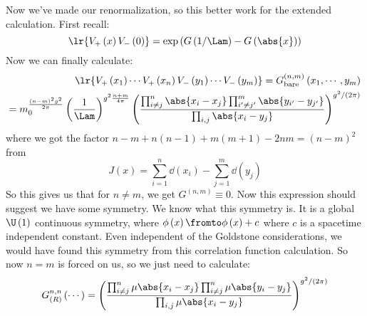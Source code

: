 \documentclass{booc}
\begin{document}
Now we've made our renormalization, so this better work for 
the extended calculation.
First recall:
\begin{equation}
\lr{V_+\left( x \right) V_-\left( 0 \right)} = 
\exp\left( 
G\left( 1/ \Lam \right) - G\left( \abs{x} \right)
\right)
\end{equation}
Now we can finally calculate:
\begin{eqnarray}
\lr{V_+\left( x_1 \right)\cdots V_+\left( x_n \right)
V_-\left( y_1 \right) \cdots V_-\left( y_m \right)}
=
G_{\text{bare}}^{\left( n,m \right)}\left( x_1, \cdots , y_m \right) \\
=
m_0^{\frac{\left( n-m \right)^2g^2 }{ 2\pi}}
\left( 
\frac{1}{\Lam}
\right)^{g^2\frac{n+m }{4\pi}}
\left( 
\frac{
\prod_{i\neq j}^n \abs{x_i - x_j}
\prod_{i'\neq j'}^m \abs{y_{i'} - y_{j'}}
}{
\prod_{i,j}\abs{x_i - y_j}
}
\right)^{g^2 / \left( 2\pi \right)}
\end{eqnarray}
where we got the factor $n-m+ n\left( n-1 \right) + m\left( m+1 \right) - 2nm = \left( n-m \right)^2$
from
\begin{equation}
J\left( x \right) = 
\sum_{i = 1}^n \dd\left( x_i \right) - 
\sum_{j =1}^m \dd\left( y_j \right)
\end{equation}
So this gives us that for
$n\neq m$, we get $G^{\left( n,m \right)} \equiv 0$.
Now this expression should suggest we have some symmetry. 
We know what this symmetry is. 
It is a global $\U\left( 1 \right)$ continuous symmetry, 
where $\phi\left( x \right)\fromto \phi\left( x \right) + c$
where $c$ is a spacetime independent constant.
Even independent of the Goldstone considerations, we would have found 
this symmetry from this correlation function calculation.
So now $n = m$ is forced on us, so we just need to calculate:
\begin{eqnarray}
G^{n,n}_{\left( R \right)}\left( \cdots \right)  
=
\left( 
\frac{
\prod^n_{i\neq j} \mu\abs{x_i - x_j} \prod^n_{i\neq j} \mu\abs{y_i - y_j}
}{
\prod_{i,j} \mu\abs{x_i - y_j}
}
\right)^{g^2 / \left( 2\pi \right)}
\end{eqnarray}
\end{document}
